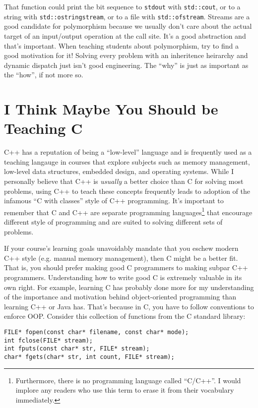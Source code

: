 \documentclass{article}
\begin{document}
That function could print the bit sequence to \lstinline{stdout} with \lstinline{std::cout}, or to a string with \lstinline{std::ostringstream}, or to a file with \lstinline{std::ofstream}.  Streams are a good candidate for polymorphism because we usually don't care about the actual target of an input/output operation at the call site.  It's a good abstraction and that's important.  When teaching students about polymorphism, try to find a good motivation for it!  Solving every problem with an inheritence heirarchy and dynamic dispatch just isn't good engineering.  The ``why'' is just as important as the ``how'', if not more so.

\section*{I Think Maybe You Should be Teaching C}
C++ has a reputation of being a ``low-level'' language and is frequently used as a teaching langauge in courses that explore subjects such as memory management, low-level data structures, embedded design, and operating systems.  While I personally believe that C++ is \emph{usually} a better choice than C for solving most problems, using C++ to teach these concepts frequently leads to adoption of the infamous ``C with classes'' style of C++ programming.  It's important to remember that C and C++ are separate programming languages\footnote{Furthermore, there is no programming language called ``C/C++''.  I would implore any readers who use this term to erase it from their vocabulary immediately.} that encourage different style of programming and are suited to solving different sets of problems.

If your course's learning goals unavoidably mandate that you eschew modern C++ style (e.g. manual memory management), then C might be a better fit.  That is, you should prefer making good C programmers to making subpar C++ programmers.  Understanding how to write good C is extremely valuable in its own right.  For example, learning C has probably done more for my understanding of the importance and motivation behind object-oriented programming than learning C++ or Java has.  That's because in C, you have to follow conventions to enforce OOP.  Consider this collection of functions from the C standard library:
\begin{lstlisting}
FILE* fopen(const char* filename, const char* mode);
int fclose(FILE* stream);
int fputs(const char* str, FILE* stream);
char* fgets(char* str, int count, FILE* stream);
\end{lstlisting}
\end{document}
